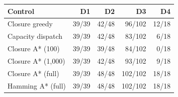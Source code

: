 \begin{tabular}{lrrrr}\toprule
Control & D1 & D2 & D3 & D4\\\midrule
Closure greedy & 39/39 & 42/48 & 96/102 & 12/18\\
Capacity dispatch & 39/39 & 42/48 & 83/102 & 6/18\\
Closure A* (100) & 39/39 & 39/48 & 84/102 & 0/18\\
Closure A* (1,000) & 39/39 & 42/48 & 93/102 & 9/18\\
Closure A* (full) & 39/39 & 48/48 & 102/102 & 18/18\\
Hamming A* (full) & 39/39 & 48/48 & 102/102 & 18/18\\
\bottomrule\end{tabular}
